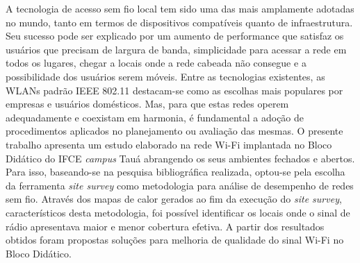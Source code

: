 A tecnologia de acesso sem fio local tem sido uma das mais amplamente adotadas no mundo, tanto em termos de dispositivos compatíveis quanto de infraestrutura. Seu sucesso pode ser explicado por um aumento de performance que satisfaz os usuários que precisam de largura de banda, simplicidade para acessar a rede em todos os lugares, chegar a locais onde a rede cabeada não consegue e a possibilidade dos usuários serem móveis. Entre as tecnologias existentes, as WLANs padrão IEEE 802.11 destacam-se como as escolhas mais populares por empresas e usuários domésticos. Mas, para que estas redes operem adequadamente e coexistam em harmonia, é fundamental a adoção de procedimentos aplicados no planejamento ou avaliação das mesmas. O presente trabalho apresenta um estudo elaborado na rede Wi-Fi implantada no Bloco Didático do IFCE \textit{campus} Tauá abrangendo os seus ambientes fechados e abertos. Para isso, baseando-se na pesquisa bibliográfica realizada, optou-se pela escolha da ferramenta \textit{site survey} como metodologia para análise de desempenho de redes sem fio. Através dos mapas de calor gerados ao fim da execução do \textit{site survey}, característicos desta metodologia, foi possível identificar os locais onde o sinal de rádio apresentava maior e menor cobertura efetiva. A partir dos resultados obtidos foram propostas soluções para melhoria de qualidade do sinal Wi-Fi no Bloco Didático.

